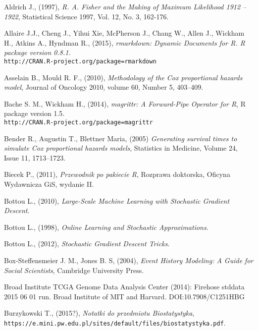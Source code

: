 \begin{thebibliography}{99}

 Aldrich J., (1997), \textit{R. A. Fisher and the Making of Maximum Likelihood 1912 – 1922}, Statistical Science 1997, Vol. 12, No. 3, 162-176.

 Allaire  J.J., Cheng J., Yihui Xie, McPherson J., Chang W., Allen J., Wickham H., Atkins A.,
 Hyndman R., (2015), \textit{rmarkdown: Dynamic Documents for R. R package version 0.8.1.} \\ \texttt{http://CRAN.R-project.org/package=rmarkdown}

 Asselain B., Mould R. F., (2010), \textit{Methodology of the Cox proportional hazards model},  Journal of Oncology 2010, volume 60, Number 5,  403–409.

 Bache S. M., Wickham H., (2014), \textit{magrittr: A Forward-Pipe Operator for R}, R package version 1.5. \\ \texttt{http://CRAN.R-project.org/package=magrittr}


 Bender R., Augustin T., Blettner Maria, (2005) \textit{Generating survival times to simulate Cox proportional hazards models}, Statistics in Medicine, Volume 24, Issue 11, 1713–1723.

 Biecek P., (2011), \textit{Przewodnik po pakiecie R}, Rozprawa doktorska, Oficyna Wydawnicza GiS, wydanie II.

 Bottou L., (2010), \textit{Large-Scale Machine Learning with Stochastic Gradient Descent}.

 Bottou L., (1998), \textit{Online Learning and Stochastic Approximations}.

 Bottou L., (2012), \textit{Stochastic Gradient Descent Tricks}.

 Box-Steffensmeier J. M., Jones B. S, (2004), \textit{Event History Modeling: A Guide for Social Scientists}, Cambridge University Press.


 Broad Institute TCGA Genome Data Analysis Center (2014): Firehose stddata 2015 06 01 run. Broad Institute of MIT and Harvard. DOI:10.7908/C1251HBG

 Burzykowski T., (2015?), \textit{Notatki do przedmiotu Biostatystyka}, \\ \texttt{https://e.mini.pw.edu.pl/sites/default/files/biostatystyka.pdf}.


\end{thebibliography}
